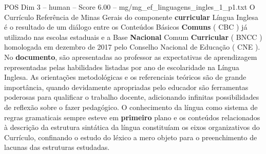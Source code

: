 \begin{textsample}{POS Dim 3 – human – Score 6.00 – mg/mg\_ef\_linguagens\_ingles\_1\_p1.txt}  \label{ex:f3_pos_011}
O Currículo Referência de Minas Gerais do componente \textbf{curricular} Língua Inglesa é o resultado de um diálogo entre os Conteúdos Básicos \textbf{Comuns} ( CBC ) já utilizado nas escolas estaduais e a Base \textbf{Nacional} Comum \textbf{Curricular} ( BNCC ) homologada em dezembro de 2017 pelo Conselho Nacional de Educação ( CNE ).
No \textbf{documento}, são apresentadas ao professor as expectativas de aprendizagem representadas pelas habilidades listadas por ano de escolaridade na Língua Inglesa.
As orientações metodológicas e os referenciais teóricos são de grande importância, quando devidamente apropriadas pelo educador são ferramentas poderosas para qualificar o trabalho docente, adicionando infinitas possibilidades de reflexão sobre o fazer pedagógico.
O conhecimento da língua como sistema de regras gramaticais sempre esteve em \textbf{primeiro} plano e os conteúdos relacionados à descrição da estrutura sintática da língua constituíam os eixos organizativos do Currículo, confinando o estudo do léxico a mero objeto para o preenchimento de lacunas das estruturas estudadas.

\end{textsample}

